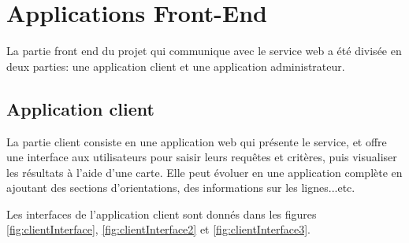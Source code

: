 \section{Applications Front-End}
\label{ref:Implementation}

La partie front end du projet qui communique avec le service web a été divisée en deux parties: une application client et une application administrateur.
\subsection{Application client}

La partie client consiste en une application web qui présente le service, et offre une interface aux utilisateurs pour saisir leurs requêtes et critères, puis visualiser les résultats à l'aide d'une carte.
Elle peut évoluer en une application complète en ajoutant des sections d'orientations, des informations sur les lignes...etc.

Les interfaces de l'application client sont donnés dans les figures \ref{fig:clientInterface}, \ref{fig:clientInterface2} et \ref{fig:clientInterface3}.

